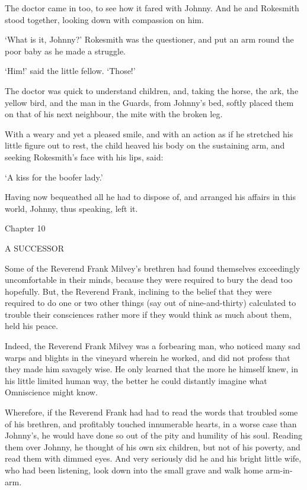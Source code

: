 The doctor came in too, to see how it fared with Johnny. And he and
Rokesmith stood together, looking down with compassion on him.

‘What is it, Johnny?’ Rokesmith was the questioner, and put an arm round
the poor baby as he made a struggle.

‘Him!’ said the little fellow. ‘Those!’

The doctor was quick to understand children, and, taking the horse,
the ark, the yellow bird, and the man in the Guards, from Johnny’s bed,
softly placed them on that of his next neighbour, the mite with the
broken leg.

With a weary and yet a pleased smile, and with an action as if he
stretched his little figure out to rest, the child heaved his body on
the sustaining arm, and seeking Rokesmith’s face with his lips, said:

‘A kiss for the boofer lady.’

Having now bequeathed all he had to dispose of, and arranged his affairs
in this world, Johnny, thus speaking, left it.



Chapter 10

A SUCCESSOR


Some of the Reverend Frank Milvey’s brethren had found themselves
exceedingly uncomfortable in their minds, because they were required to
bury the dead too hopefully. But, the Reverend Frank, inclining to the
belief that they were required to do one or two other things (say out of
nine-and-thirty) calculated to trouble their consciences rather more if
they would think as much about them, held his peace.

Indeed, the Reverend Frank Milvey was a forbearing man, who noticed many
sad warps and blights in the vineyard wherein he worked, and did not
profess that they made him savagely wise. He only learned that the more
he himself knew, in his little limited human way, the better he could
distantly imagine what Omniscience might know.

Wherefore, if the Reverend Frank had had to read the words that troubled
some of his brethren, and profitably touched innumerable hearts, in
a worse case than Johnny’s, he would have done so out of the pity and
humility of his soul. Reading them over Johnny, he thought of his own
six children, but not of his poverty, and read them with dimmed eyes.
And very seriously did he and his bright little wife, who had been
listening, look down into the small grave and walk home arm-in-arm.


